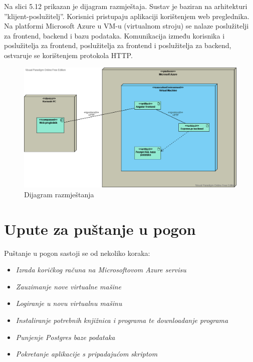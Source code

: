 			 Na slici 5.12 prikazan je dijagram razmještaja. Sustav je baziran na arhitekturi ”klijent-poslužitelj”. Korisnici pristupaju aplikaciji korištenjem web preglednika. Na platformi Microsoft Azure u VM-u (virtualnom stroju) se nalaze poslužitelji za frontend, backend i bazu podataka. Komunikacija između korisnika i poslužitelja za frontend, poslužitelja za frontend i poslužitelja za backend, ostvaruje se korištenjem protokola HTTP.
			 
			 
			 
			 \begin{figure}[H]
			            \includegraphics[width=\textwidth]{slike/Dijagram_razmjestaja_v2.png} %
			          \caption{Dijagram razmještanja}
			            \label{fig:dijagram_razmjestanja} %
		      \end{figure}
			
			\eject 
		
		\section{Upute za puštanje u pogon}
				
			 Puštanje u pogon sastoji se od nekoliko koraka:
    \begin{itemize}
		\item 	\textit{Izrada koričkog računa na Microsoftovom Azure servisu}
		\item 	\textit{Zauzimanje nove virtualne mašine}
		\item 	\textit{Logiranje u novu virtualnu mašinu}
		\item 	\textit{Instaliranje potrebnih knjižnica i programa te downloadanje programa}
		\item 	\textit{Punjenje Postgres baze podataka}
		\item 	\textit{Pokretanje aplikacije s pripadajućom skriptom}
	\end{itemize}

